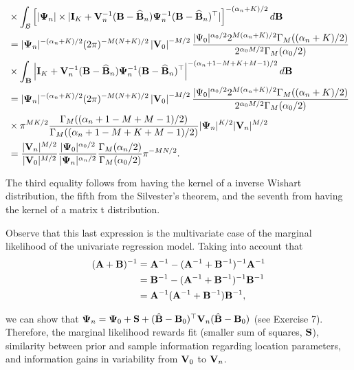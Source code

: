 \begin{align*}
	&\times \int_{\mathcal{B}}\left[|{\bf{\Psi}}_n|\times |{\bf{I}}_{K}+{\bf{V}}_n^{-1}({\bf{B}}-\widehat{\bf{B}}_n){\bf{\Psi}}_n^{-1}({\bf{B}}-\widehat{\bf{B}}_n)^{\top}|\right]^{-(\alpha_n+K)/2}d{\bf{B}}\\
	&=|{\bf{\Psi}}_n|^{-(\alpha_n+K)/2}(2\pi)^{-M(N+K)/2}\left|{\bf V}_0\right|^{-M/2}\frac{|\Psi_0|^{\alpha_0/2}2^{M(\alpha_n+K)/2}\Gamma_M((\alpha_n+K)/2)}{2^{\alpha_0M/2}\Gamma_M(\alpha_0/2)}\\
	&\times \int_{\mathcal{{\bf{B}}}}\left| {\bf{I}}_{K}+{\bf{V}}_n^{-1}({\bf{B}}-\widehat{\bf{B}}_n){\bf{\Psi}}_n^{-1}({\bf{B}}-\widehat{\bf{B}}_n)^{\top}\right|^{-(\alpha_n+1-M+K+M-1)/2}d{\bf{B}}\\
	&=|{\bf{\Psi}}_n|^{-(\alpha_n+K)/2}(2\pi)^{-M(N+K)/2}\left|{\bf V}_0\right|^{-M/2}\frac{|\Psi_0|^{\alpha_0/2}2^{M(\alpha_n+K)/2}\Gamma_M((\alpha_n+K)/2)}{2^{\alpha_0M/2}\Gamma_M(\alpha_0/2)}\\
	&\times \pi^{MK/2}\frac{\Gamma_M((\alpha_n+1-M+M-1)/2)}{\Gamma_M((\alpha_n+1-M+K+M-1)/2)}|{\bf{\Psi}}_n|^{K/2}|{\bf{V}}_n|^{M/2}\\
	&=\frac{|{\bf{V}}_n|^{M/2}}{|{\bf{V}}_0|^{M/2}}\frac{|{\bf{\Psi}}_0|^{\alpha_0/2}}{|{\bf{\Psi}}_n|^{\alpha_n/2}}\frac{\Gamma_M(\alpha_n/2)}{\Gamma_M(\alpha_0/2)}\pi^{-MN/2}.  
\end{align*}

The third equality follows from having the kernel of a inverse Wishart distribution, the fifth from the Silvester's theorem, and the seventh from having the kernel of a matrix t distribution.

Observe that this last expression is the multivariate case of the marginal likelihood of the univariate regression model. Taking into account that 
\begin{align*}
	({\bf{A}}+{\bf{B}})^{-1}&={\bf{A}}^{-1}-({\bf{A}}^{-1}+{\bf{B}}^{-1})^{-1}{\bf{A}}^{-1}\\
	&={\bf{B}}^{-1}-({\bf{A}}^{-1}+{\bf{B}}^{-1})^{-1}{\bf{B}}^{-1}\\
	&={\bf{A}}^{-1}({\bf{A}}^{-1}+{\bf{B}}^{-1}){\bf{B}}^{-1},
\end{align*} 

we can show that ${\bf{\Psi}}_{n}={\bf{\Psi}}_{0}+{\bf{S}}+(\hat{\bf{B}}-{\bf{B}}_{0})^{\top}{\bf{V}}_{n}(\hat{\bf{B}}-{\bf{B}}_{0})$ (see Exercise 7). Therefore, the marginal likelihood rewards fit (smaller sum of squares, ${\bf{S}}$), similarity between prior and sample information regarding location parameters, and information gains in variability from ${\bf{V}}_0$ to ${\bf{V}}_n$.   

